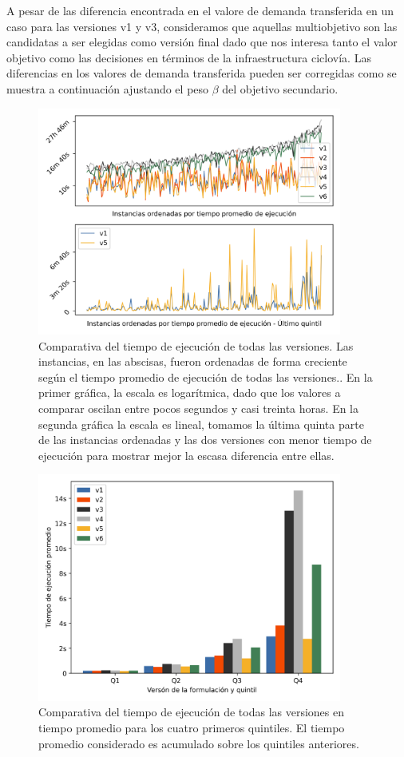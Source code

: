 \documentclass{article}
\begin{document}
  A pesar de las diferencia encontrada en el valore de demanda transferida en un caso para las versiones v1 y v3, consideramos que aquellas multiobjetivo son las candidatas a ser elegidas como versión final dado que nos interesa tanto el valor objetivo como las decisiones en términos de la infraestructura ciclovía. Las diferencias en los valores de demanda transferida pueden ser corregidas como se muestra a continuación ajustando el peso $\beta$ del objetivo secundario.

  \begin{figure}[h!]
    \centering
    \includegraphics[width=10cm]{../resources/run_time_comparsion.png}
    \caption{Comparativa del tiempo de ejecución de todas las versiones. Las instancias, en las abscisas, fueron ordenadas de forma creciente según el tiempo promedio de ejecución de todas las versiones.. En la primer gráfica, la escala es logarítmica, dado que los valores a comparar oscilan entre pocos segundos y casi treinta horas. En la segunda gráfica la escala es lineal, tomamos la última quinta parte de las instancias ordenadas y las dos versiones con menor tiempo de ejecución para mostrar mejor la escasa diferencia entre ellas.}
    \label{fig:runtimecomparison}
  \end{figure}

  \begin{figure}[h!]
    \centering
    \includegraphics[width=10cm]{../resources/run_time_comparsion_by_quintile.png}
      \caption{Comparativa del tiempo de ejecución de todas las versiones en tiempo promedio para los cuatro primeros quintiles. El tiempo promedio considerado es acumulado sobre los quintiles anteriores.}
    \label{fig:firstfourquintiles}
  \end{figure}
\end{document}
